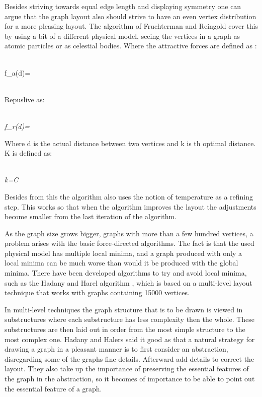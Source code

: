 \documentclass[a4paper,11pt]{kth-mag}
\begin{document}
Besides striving towards equal edge length and displaying symmetry one can argue that the graph layout also should strive to have an even vertex distribution for a more pleasing layout. The algorithm of Fruchterman and Reingold
cover this by using a bit of a different physical model, seeing the vertices in a graph as atomic particles or as celestial bodies. Where the attractive forces are defined as \cite{1338}:\\
\begin{mathsurround}
\\
\math f_{a}(d)=\\
\\
\end{mathsurround}
 Repuslive as:\\
\begin{mathsurround}
\\
\emph{\math f_{r}(d)=}
\\
\end{mathsurround}
Where d is the actual distance between two vertices and k is th optimal distance. K is defined as:\\
\begin{mathsurround}
\\
\emph{\math k=C}
\\
\end{mathsurround}

Besides from this the algorithm also uses the notion of temperature as a refining step. This works so that when the algorithm improves the layout the adjustments become smaller from the last iteration of the algorithm.
 
As the graph size grows bigger, graphs with more than a few hundred vertices, a problem arises with the basic force-directed algorithms. The fact is that the used physical model has multiple local minima, and a graph produced
with only a local minima can be much worse than would it be produced with the global minima. There have been developed algorithms to try and avoid local minima, such as the Hadany and Harel algorithm \cite{handh}, which is based on
a multi-level layout technique that works with graphs containing 15000 vertices. 

In multi-level techniques the graph structure that is to be drawn is viewed in substructures where each substructure has less complexity then the whole. These substructures are then laid out in order from the most simple 
structure to the most complex one. Hadany and Halers \cite{handh} said it good as that a natural strategy for drawing a graph in a pleasant manner is to first consider an abstraction, 
disregarding some of the graphs fine details. Afterward add details to correct the layout. They also take up the importance of preserving the essential features of the graph in the abstraction,
so it becomes of importance to be able to point out the essential feature of a graph. 
\end{document}
